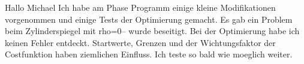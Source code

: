 Hallo Michael
Ich habe am Phase Programm einige kleine Modifikationen vorgenommen und einige 
Tests der Optimierung gemacht. Es gab ein Problem beim Zylinderspiegel mit
rho=0-- wurde beseitigt. Bei der Optimierung habe ich keinen Fehler entdeckt.
Startwerte, Grenzen und der Wichtungsfaktor der Costfunktion haben ziemlichen
Einfluss. Ich teste so bald wie moeglich weiter. 

